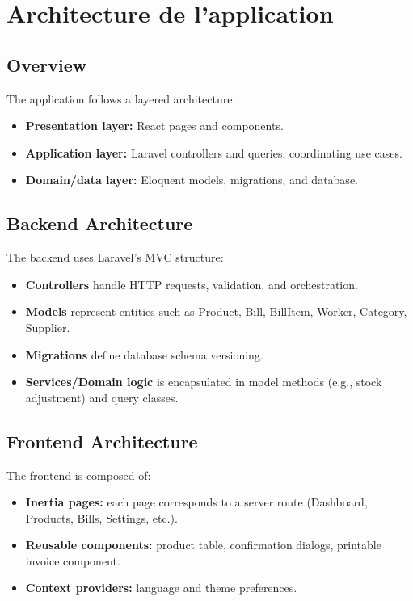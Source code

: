 \documentclass[12pt,a4paper]{report}
\begin{document}
\chapter{Architecture de l’application}

\section{Overview}
The application follows a layered architecture:
\begin{itemize}
  \item \textbf{Presentation layer:} React pages and components.
  \item \textbf{Application layer:} Laravel controllers and queries, coordinating use cases.
  \item \textbf{Domain/data layer:} Eloquent models, migrations, and database.
\end{itemize}

\section{Backend Architecture}
The backend uses Laravel's MVC structure:
\begin{itemize}
  \item \textbf{Controllers} handle HTTP requests, validation, and orchestration.
  \item \textbf{Models} represent entities such as Product, Bill, BillItem, Worker, Category, Supplier.
  \item \textbf{Migrations} define database schema versioning.
  \item \textbf{Services/Domain logic} is encapsulated in model methods (e.g., stock adjustment) and query classes.
\end{itemize}

\section{Frontend Architecture}
The frontend is composed of:
\begin{itemize}
  \item \textbf{Inertia pages:} each page corresponds to a server route (Dashboard, Products, Bills, Settings, etc.).
  \item \textbf{Reusable components:} product table, confirmation dialogs, printable invoice component.
  \item \textbf{Context providers:} language and theme preferences.
\end{itemize}
\end{document}
